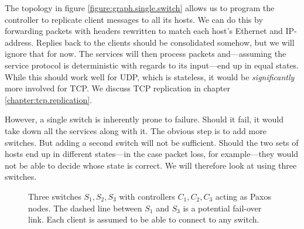 The topology in figure \vref{figure:graph.single.switch} allows us to
program the controller to replicate client messages to all its hosts.
%
We can do this by forwarding packets with headers rewritten to match each
host's Ethernet and IP-address.  Replies back to the clients should be
consolidated somehow, but we will ignore that for now.
%
The services will then process packets and---assuming the service protocol
is deterministic with regards to its input---end up in equal states.
%
While this should work well for \acs{UDP}, which is
stateless, it would be \textit{significantly} more involved
for \acs{TCP}.  We discuss TCP replication in chapter
\vref{chapter:tcp.replication}.

However, a single switch is inherently prone to failure.  Should it fail, it
would take down all the services along with it.
%
The obvious step is to add more switches.
%
But adding a second switch will not be sufficient.  Should the two sets of
hosts end up in different states---in the case packet loss, for
example---they would not be able to decide whose state is correct.
%
We will therefore look at using three switches.

\begin{figure}[H]
  \centering
  \caption{Three switches $S_1, S_2, S_3$ with controllers $C_1, C_2, C_3$ acting as Paxos nodes.
           The dashed line between $S_1$ and $S_3$ is a potential fail-over
             link.  Each client is assumed to be able to connect to any
             switch.}
  \label{figure:graph.three.switches}
\end{figure}

